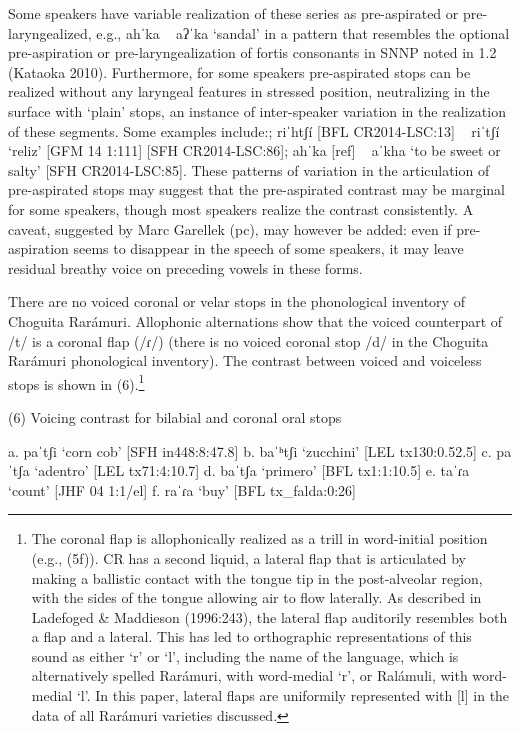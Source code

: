 Some speakers have variable realization of these series as pre-aspirated or pre-laryngealized, e.g., ahˈka ~ aʔˈka ‘sandal’ in a pattern that resembles the optional pre-aspiration or pre-laryngealization of fortis consonants in SNNP noted in 1.2 (Kataoka 2010). Furthermore, for some speakers pre-aspirated stops can be realized without any laryngeal features in stressed position, neutralizing in the surface with ‘plain’ stops, an instance of inter-speaker variation in the realization of these segments. Some examples include:; riˈhtʃí [BFL CR2014-LSC:13] ~ riˈtʃí ‘reliz’ [GFM 14 1:111] [SFH CR2014-LSC:86]; ahˈka [ref] ~ aˈkha ‘to be sweet or salty’ [SFH CR2014-LSC:85]. These patterns of variation in the articulation of pre-aspirated stops may suggest that the pre-aspirated contrast may be marginal for some speakers, though most speakers realize the contrast consistently. A caveat, suggested by Marc Garellek (pc), may however be added: even if pre-aspiration seems to disappear in the speech of some speakers, it may leave residual breathy voice on preceding vowels in these forms.

There are no voiced coronal or velar stops in the phonological inventory of Choguita Rarámuri. Allophonic alternations show that the voiced counterpart of /t/ is a coronal flap (/ɾ/) (there is no voiced coronal stop /d/ in the Choguita Rarámuri phonological inventory). The contrast between voiced and voiceless stops is shown in (6).\footnote{The coronal flap is allophonically realized as a trill in word-initial position (e.g., (5f)). CR has a second liquid, a lateral flap that is articulated by making a ballistic contact with the tongue tip in the post-alveolar region, with the sides of the tongue allowing air to flow laterally. As described in Ladefoged \& Maddieson (1996:243), the lateral flap auditorily resembles both a flap and a lateral. This has led to orthographic representations of this sound as either ‘r’ or ‘l’, including the name of the language, which is alternatively spelled Rarámuri, with word-medial ‘r’, or Ralámuli, with word-medial ‘l’. In this paper, lateral flaps are uniformily represented with [l] in the data of all Rarámuri varieties discussed.}

(6)	Voicing contrast for bilabial and coronal oral stops

a.	paˈtʃi 		‘corn cob’ 							[SFH in448:8:47.8]
b.	baˈʰtʃi 		‘zucchini’							[LEL tx130:0.52.5]
c.	paˈtʃa	 	‘adentro’ 							[LEL tx71:4:10.7]
d.	baˈtʃa  		‘primero’							[BFL tx1:1:10.5]
e.	taˈɾa		‘count’								[JHF 04 1:1/el]
f.	raˈɾa		‘buy’								[BFL tx\_falda:0:26]

